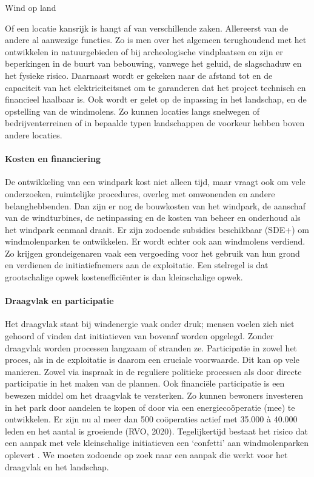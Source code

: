 \begin{voorstel}{Wind op land}
\begin{multicols}{2}
\begin{overwegingen}
Of een locatie kansrijk is hangt af van verschillende zaken. Allereerst van de andere al aanwezige functies. Zo is men over het algemeen terughoudend met het ontwikkelen in natuurgebieden of bij archeologische vindplaatsen en zijn er beperkingen in de buurt van bebouwing, vanwege het geluid, de slagschaduw en het fysieke risico. Daarnaast wordt er gekeken naar de afstand tot en de capaciteit van het elektriciteitsnet om te garanderen dat het project technisch en financieel haalbaar is. Ook wordt er gelet op de inpassing in het landschap, en de opstelling van de windmolens. Zo kunnen locaties langs snelwegen of bedrijventerreinen of in bepaalde typen landschappen de voorkeur hebben boven andere locaties.


\paragraph{Kosten en financiering}
De ontwikkeling van een windpark kost niet alleen tijd, maar vraagt ook om vele onderzoeken, ruimtelijke procedures, overleg met omwonenden en andere belanghebbenden. Dan zijn er nog de bouwkosten van het windpark, de aanschaf van de windturbines, de netinpassing en de kosten van beheer en onderhoud als het windpark eenmaal draait. Er zijn zodoende subsidies beschikbaar (SDE+) om windmolenparken te ontwikkelen. Er wordt echter ook aan windmolens verdiend. Zo krijgen grondeigenaren vaak een vergoeding voor het gebruik van hun grond en verdienen de initiatiefnemers aan de exploitatie. Een stelregel is dat grootschalige opwek kostenefficiënter is dan kleinschalige opwek.


\paragraph{Draagvlak en participatie}
Het draagvlak staat bij windenergie vaak onder druk; mensen voelen zich niet gehoord of vinden dat initiatieven van bovenaf worden opgelegd. Zonder draagvlak worden processen langzaam of stranden ze. Participatie in zowel het proces, als in de exploitatie is daarom een cruciale voorwaarde. Dit kan op vele manieren. Zowel via inspraak in de reguliere politieke processen als door directe participatie in het maken van de plannen. Ook financiële participatie is een bewezen middel om het draagvlak te versterken. Zo kunnen bewoners investeren in het park door aandelen te kopen of door via een energiecoöperatie (mee) te ontwikkelen. Er zijn nu al meer dan 500 coöperaties actief met 35.000 à 40.000 leden en het aantal is groeiende (RVO, 2020). Tegelijkertijd bestaat het risico dat een aanpak met vele kleinschalige initiatieven een ‘confetti’ aan windmolenparken oplevert \parencite{college_van_rijksadviseurs_via_2019}. We moeten zodoende op zoek naar een aanpak die werkt voor het draagvlak en het landschap.


\end{overwegingen}
\end{multicols}
\end{voorstel}
